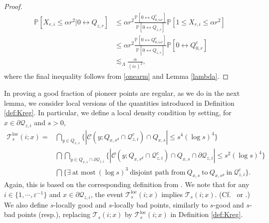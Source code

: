 \documentclass[11pt]{article}
\theoremstyle{definition}
\theoremstyle{remark}
\newcommand{\bP}{\mathbb{P}}
\numberwithin{equation}{section}
\theoremstyle{plain}
\theoremstyle{definition}
\theoremstyle{remark}
\theoremstyle{plain}
\begin{document}
\begin{proof}
    \begin{align*}
       \bP[X_{r,i}\le \alpha r^2| 0 \leftrightarrow Q_{z,r}]&\le \alpha r^2 \frac{\bP[0 \longleftrightarrow Q_{0,i\varepsilon r}^c] }{\bP[0\leftrightarrow Q_{z,r}]}\bP[1\le X_{r,i}\le \alpha r^2] \\
       &\le \alpha r^2 \frac{\bP[0 \longleftrightarrow Q_{0,i\varepsilon r}^c] }{\bP[0\leftrightarrow Q_{z,r}]}\bP[0\longleftrightarrow Q_{0,r}^c]\\
       &\lesssim_{\Lambda} \frac{\alpha}{(i\varepsilon)^2},
    \end{align*}
    where the final inequality follows from \eqref{onearm} and Lemma \ref{lambda}.
\end{proof}

In proving a good fraction of pioneer points are regular, as we do in the next lemma, we consider local versions of the quantities introduced in Definition \ref{def:Kreg}. In particular, we define a local density condition by setting, for $x \in \partial \mathcal Q_{z, i}$ and $s>0$,
\begin{align*}
\mathcal T_{s}^{\mathrm{loc}}(i;x)=&\bigcap_{y \in Q_{x,s}}\big\{ |\mathcal C(y; Q_{x,s^d}\cap \mathcal Q_{z,i}^c)\cap Q_{x,s}|\le s^4(\log s)^4\big\} \\
&\bigcap \bigcap_{y \in Q_{x,s} \cap \partial \mathcal Q_{z,i}}\big\{ |\mathcal C(y; Q_{x,s^d}\cap \mathcal Q_{z,i}^c)\cap Q_{x,s} \cap \partial \mathcal Q_{z,i}|\le s^2(\log s)^4\big\}\\
&\bigcap \big\{ \exists \:\text{at most}~(\log s)^3~\text{disjoint path from}~Q_{x,s}~\text{to}~Q_{x,s^d}~\text{in}~\mathcal Q_{z,i}^c \big\}.
\end{align*}
Again, this is based on the corresponding definition from \cite{ASS}. We note that for any $i \in \{1,\cdots, \varepsilon^{-1}\}$ and $x \in \partial \mathcal Q_{z, i}$, the event $\mathcal T_{s}^{\mathrm{loc}}(i;x)$ implies $\mathcal T_{s}(i;x)$. (Cf.\ \cite[Claim 5.4]{ASS} or \cite[Claim 4.1]{KN11}.) We also define $s$-locally good and $s$-locally bad points, similarly to $s$-good and $s$-bad points (resp.), replacing $\mathcal T_{s}(i;x)$ by $\mathcal T_{s}^{\mathrm{loc}}(i;x)$ in Definition \ref{def:Kreg}.
\end{document}
